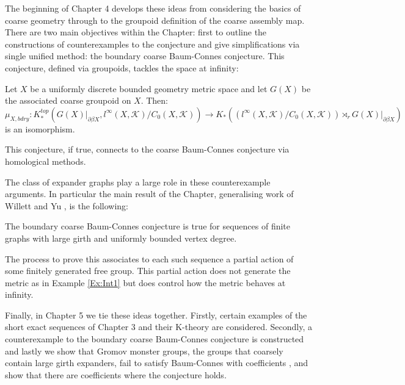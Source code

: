 The beginning of Chapter 4 develops these ideas from considering the basics of coarse geometry through to the groupoid definition of the coarse assembly map. There are two main objectives within the Chapter: first to outline the constructions of counterexamples to the conjecture \cite{higsonpreprint,MR1911663,explg1,explg2,MR2568691} and give simplifications via single unified method: the boundary coarse Baum-Connes conjecture. This conjecture, defined via groupoids, tackles the space at infinity:
\begin{conjecture}
Let $X$ be a uniformly discrete bounded geometry metric space and let $G(X)$ be the associated coarse groupoid on $X$. Then:
\begin{equation*}
\mu_{X,bdry}:K_{*}^{top}(G(X)|_{\partial\beta X}, l^{\infty}(X,\mathcal{K})/C_{0}(X,\mathcal{K})) \rightarrow K_{*}((l^{\infty}(X,\mathcal{K})/C_{0}(X,\mathcal{K}))\rtimes_{r}G(X)|_{\partial\beta X})
\end{equation*}
is an isomorphism.
\end{conjecture}
This conjecture, if true, connects to the coarse Baum-Connes conjecture via homological methods. 

The class of expander graphs \cite{MR2247919} play a large role in these counterexample arguments. In particular the main result of the Chapter, generalising work of Willett and Yu \cite{explg1}, is the following:
\begin{thm}
The boundary coarse Baum-Connes conjecture is true for sequences of finite graphs with large girth and uniformly bounded vertex degree.
\end{thm}

The process to prove this associates to each such sequence a partial action of some finitely generated free group. This partial action does not generate the metric as in Example \ref{Ex:Int1} but does control how the metric behaves at infinity. 

Finally, in Chapter 5 we tie these ideas together. Firstly, certain examples of the short exact sequences of Chapter 3 and their K-theory are considered. Secondly, a counterexample to the boundary coarse Baum-Connes conjecture is constructed and lastly we show that Gromov monster groups, the groups that coarsely contain large girth expanders, fail to satisfy Baum-Connes with coefficients \cite{MR1978492,exrangrps}, and show that there are coefficients where the conjecture holds.

